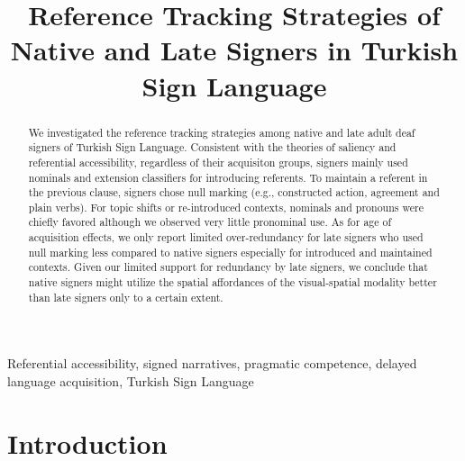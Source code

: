 \documentclass[]{elsarticle} %
\begin{document}
\begin{frontmatter}

  \title{Reference Tracking Strategies of Native and Late Signers in
Turkish Sign Language}
      
  \begin{abstract}
  We investigated the reference tracking strategies among native and
  late adult deaf signers of Turkish Sign Language. Consistent with the
  theories of saliency and referential accessibility, regardless of
  their acquisiton groups, signers mainly used nominals and extension
  classifiers for introducing referents. To maintain a referent in the
  previous clause, signers chose null marking (e.g., constructed action,
  agreement and plain verbs). For topic shifts or re-introduced
  contexts, nominals and pronouns were chiefly favored although we
  observed very little pronominal use. As for age of acquisition
  effects, we only report limited over-redundancy for late signers who
  used null marking less compared to native signers especially for
  introduced and maintained contexts. Given our limited support for
  redundancy by late signers, we conclude that native signers might
  utilize the spatial affordances of the visual-spatial modality better
  than late signers only to a certain extent.
  \end{abstract}
   \begin{keyword} Referential accessibility, signed narratives,
pragmatic competence, delayed language acquisition, Turkish Sign
Language\end{keyword}
 \end{frontmatter}

\hypertarget{introduction}{%
\section{Introduction}\label{introduction}}
\end{document}
